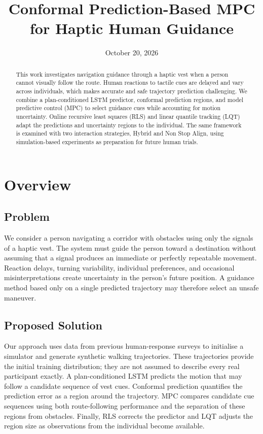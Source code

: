 \documentclass[11pt,a4paper]{article}
\title{Conformal Prediction-Based MPC for Haptic Human Guidance}
\author{}
\date{October 20, 2026}
\newcommand{\NSA}{Non Stop Align}
\begin{document}
\maketitle

\begin{abstract}
This work investigates navigation guidance through a haptic vest when a person cannot visually follow the route. Human reactions to tactile cues are delayed and vary across individuals, which makes accurate and safe trajectory prediction challenging. We combine a plan-conditioned LSTM predictor, conformal prediction regions, and model predictive control (MPC) to select guidance cues while accounting for motion uncertainty. Online recursive least squares (RLS) and linear quantile tracking (LQT) adapt the predictions and uncertainty regions to the individual. The same framework is examined with two interaction strategies, Hybrid and \NSA, using simulation-based experiments as preparation for future human trials.
\end{abstract}
\tableofcontents
\clearpage

\section{Overview}
\label{sec:overview}

\subsection*{Problem}
We consider a person navigating a corridor with obstacles using only the signals of a haptic vest. The system must guide the person toward a destination without assuming that a signal produces an immediate or perfectly repeatable movement. Reaction delays, turning variability, individual preferences, and occasional misinterpretations create uncertainty in the person's future position. A guidance method based only on a single predicted trajectory may therefore select an unsafe maneuver.

\subsection*{Proposed Solution}
Our approach uses data from previous human-response surveys to initialise a simulator and generate synthetic walking trajectories. These trajectories provide the initial training distribution; they are not assumed to describe every real participant exactly. A plan-conditioned LSTM predicts the motion that may follow a candidate sequence of vest cues. Conformal prediction quantifies the prediction error as a region around the trajectory. MPC compares candidate cue sequences using both route-following performance and the separation of these regions from obstacles. Finally, RLS corrects the predictor and LQT adjusts the region size as observations from the individual become available.
\end{document}
